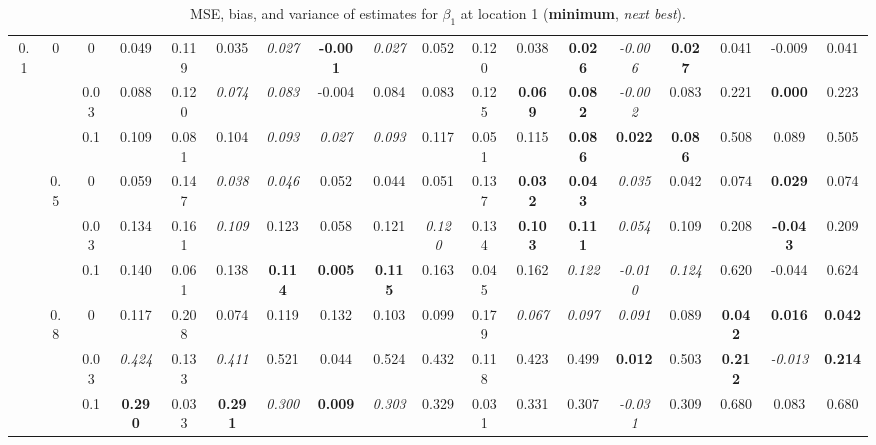 \documentclass[authoryear, review, 10pt]{elsarticle}
\begin{document}
\begin{sidewaystable}[ht]
\begin{center}
\begin{tabular}{ccc|ccc|ccc|ccc|ccc|ccc}
\multirow{9}{*}{0.1} & \multirow{3}{*}{0} & 0 &   0.049 & 0.119 & 0.035 & \emph{0.027} & \textbf{-0.001} & \emph{0.027} & 0.052 & 0.120 & 0.038 & \textbf{0.026} & \emph{-0.006} & \textbf{0.027} & 0.041 & -0.009 & 0.041 \\ 
 &  & 0.03 &   0.088 & 0.120 & \emph{0.074} & \emph{0.083} & -0.004 & 0.084 & 0.083 & 0.125 & \textbf{0.069} & \textbf{0.082} & \emph{-0.002} & 0.083 & 0.221 & \textbf{0.000} & 0.223 \\ 
 &  & 0.1 &   0.109 & 0.081 & 0.104 & \emph{0.093} & \emph{0.027} & \emph{0.093} & 0.117 & 0.051 & 0.115 & \textbf{0.086} & \textbf{0.022} & \textbf{0.086} & 0.508 & 0.089 & 0.505 \\ \cline{2-18}
 & \multirow{3}{*}{0.5} & 0 &   0.059 & 0.147 & \emph{0.038} & \emph{0.046} & 0.052 & 0.044 & 0.051 & 0.137 & \textbf{0.032} & \textbf{0.043} & \emph{0.035} & 0.042 & 0.074 & \textbf{0.029} & 0.074 \\ 
 &  & 0.03 &   0.134 & 0.161 & \emph{0.109} & 0.123 & 0.058 & 0.121 & \emph{0.120} & 0.134 & \textbf{0.103} & \textbf{0.111} & \emph{0.054} & 0.109 & 0.208 & \textbf{-0.043} & 0.209 \\ 
 &  & 0.1 &   0.140 & 0.061 & 0.138 & \textbf{0.114} & \textbf{0.005} & \textbf{0.115} & 0.163 & 0.045 & 0.162 & \emph{0.122} & \emph{-0.010} & \emph{0.124} & 0.620 & -0.044 & 0.624 \\ \cline{2-18}
 & \multirow{3}{*}{0.8} & 0 &   0.117 & 0.208 & 0.074 & 0.119 & 0.132 & 0.103 & 0.099 & 0.179 & \emph{0.067} & \emph{0.097} & \emph{0.091} & 0.089 & \textbf{0.042} & \textbf{0.016} & \textbf{0.042} \\ 
 &  & 0.03 &   \emph{0.424} & 0.133 & \emph{0.411} & 0.521 & 0.044 & 0.524 & 0.432 & 0.118 & 0.423 & 0.499 & \textbf{0.012} & 0.503 & \textbf{0.212} & \emph{-0.013} & \textbf{0.214} \\ 
 &  & 0.1 &   \textbf{0.290} & 0.033 & \textbf{0.291} & \emph{0.300} & \textbf{0.009} & \emph{0.303} & 0.329 & 0.031 & 0.331 & 0.307 & \emph{-0.031} & 0.309 & 0.680 & 0.083 & 0.680 \\ 
  \end{tabular}
\caption{MSE, bias, and variance of estimates for $\beta_1$ at location 1 (\textbf{minimum}, \emph{next best}).}
\end{center}
\end{sidewaystable}
\end{document}
